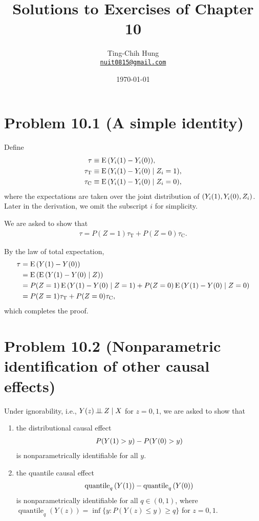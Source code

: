 \documentclass[10pt]{article}
\title{Solutions to Exercises of Chapter 10}
\author{Ting-Chih Hung \\ \href{mailto:nuit0815@gmail.com}{\texttt{nuit0815@gmail.com}}}
\date{\today}
\begin{document}
\maketitle

\section*{Problem 10.1 (A simple identity)}

Define 
\begin{align*}
  \tau &\equiv \operatorname{E}{\left( Y_i(1) - Y_i(0) \right)}, \\
  \tau_{\text{T}} &\equiv \operatorname{E}{\left( Y_i(1) - Y_i(0) \mid Z_i = 1 \right)}, \\
  \tau_{\text{C}} &\equiv \operatorname{E}{\left( Y_i(1) - Y_i(0) \mid Z_i = 0 \right)},
\end{align*}
where the expectations are taken over the 
joint distribution of ${\left( Y_i(1), Y_i(0), Z_i \right)}$.
Later in the derivation,
we omit the subscript $i$ for simplicity.

We are asked to show that
\begin{align*}
  \tau = P(Z = 1) \tau_{\text{T}} + P(Z = 0) \tau_{\text{C}}.
\end{align*}

By the law of total expectation,
\begin{align*}
  \tau 
  &= \operatorname{E}{\left( Y(1) - Y(0) \right)} \\
  &= \operatorname{E}{\left( \operatorname{E}{\left( Y(1) - Y(0) \mid Z \right)} \right)} \\
  &= P(Z = 1) \operatorname{E}{\left( Y(1) - Y(0) \mid Z = 1 \right)} + P(Z = 0) \operatorname{E}{\left( Y(1) - Y(0) \mid Z = 0 \right)} \\
  &= P(Z = 1) \tau_{\text{T}} + P(Z = 0) \tau_{\text{C}},
\end{align*}
which completes the proof.

\section*{Problem 10.2 (Nonparametric identification of other causal effects)}

Under ignorability, 
i.e., $Y(z) \operatorname{\perp\!\!\!\perp} Z \mid X$ for $z = 0, 1$,
we are asked to show that
\begin{enumerate}
  \item the distributional causal effect
    \begin{align*}
      P{\left( Y(1) > y \right)} - P{\left( Y(0) > y \right)}
    \end{align*}
    is nonparametrically identifiable for all $y$.

  \item the quantile causal effect
    \begin{align*}
      \operatorname{quantile}_q{\left( Y(1) \right)} - \operatorname{quantile}_q{\left( Y(0) \right)}
    \end{align*}
    is nonparametrically identifiable for all $q \in (0, 1)$,
    where $\operatorname{quantile}_q(Y(z)) = \inf\{y: P(Y(z) \leq y) \geq q\}$ for $z = 0, 1$.
\end{enumerate}
\end{document}
